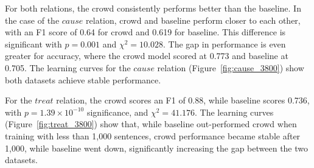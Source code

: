 \begin{table}[!htb]
\centering
{}
\caption{Model evaluation results over 3,984 sentences. Crowd scores are shown at 0.5 sentence-relation score threshold.}
\label{tab:statistic_bas}
\end{table}

For both relations, the crowd consistently performs better than the baseline. In the case of the $cause$ relation, crowd and baseline perform closer to each other, with an F1 score of 0.64 for crowd and 0.619 for baseline. This difference is significant with $ p = 0.001 $ and $\chi^2 = 10.028$. The gap in performance is even greater for accuracy, where the  crowd model scored at 0.773 and baseline at 0.705. The learning curves for the $cause$ relation (Figure~\ref{fig:cause_3800}) show both datasets achieve stable performance.

For the $treat$ relation, the crowd scores an F1 of 0.88, while baseline scores 0.736, with $p = 1.39 \times 10^{-10} $ significance, and $\chi^2 = 41.176$. The learning curves (Figure~\ref{fig:treat_3800}) show that, while baseline out-performed crowd when training with less than 1,000 sentences, crowd performance became stable after 1,000, while baseline went down, significantly increasing the gap between the two datasets.

